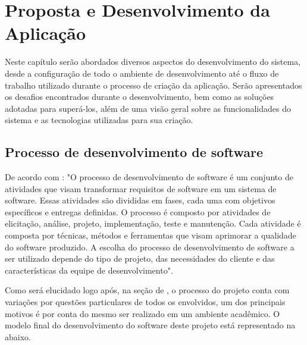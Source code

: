 \chapter{Proposta e Desenvolvimento da Aplicação}\label{ch:proposta}
Neste capítulo serão abordados diversos aspectos do desenvolvimento do sistema, desde a configuração de todo o ambiente de desenvolvimento até o fluxo de trabalho utilizado durante o processo de criação da aplicação. Serão apresentados os desafios encontrados durante o desenvolvimento, bem como as soluções adotadas para superá-los, além de uma visão geral sobre as funcionalidades do sistema e as tecnologias utilizadas para sua criação.

\section{Processo de desenvolvimento de software}
De acordo com \cite{sommerville2011software}: "O processo de desenvolvimento de software é um conjunto de atividades que visam transformar requisitos de software em um sistema de software. Essas atividades são divididas em fases, cada uma com objetivos específicos e entregas definidas. O processo é composto por atividades de elicitação, análise, projeto, implementação, teste e manutenção. Cada atividade é composta por técnicas, métodos e ferramentas que visam aprimorar a qualidade do software produzido. A escolha do processo de desenvolvimento de software a ser utilizado depende do tipo de projeto, das necessidades do cliente e das características da equipe de desenvolvimento".

Como será elucidado logo após, na seção de , o processo do projeto conta com variações por questões particulares de todos os envolvidos, um dos principais motivos é por conta do mesmo ser realizado em um ambiente acadêmico. O modelo final do desenvolvimento do software deste projeto está representado na  abaixo.

